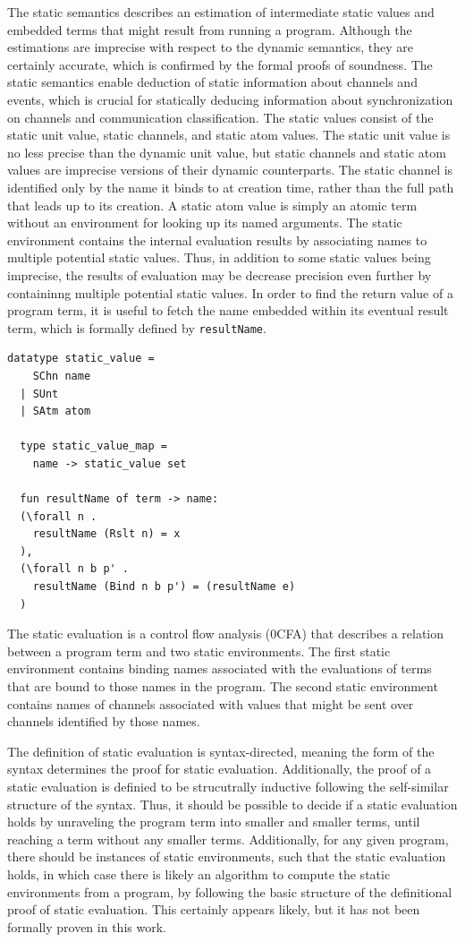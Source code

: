 \documentclass[10pt]{article}
\begin{document}
The static semantics describes an estimation of intermediate static values and embedded terms
that might result from running a program.  Although the estimations are imprecise with
respect to the dynamic semantics, they are certainly accurate,
which is confirmed by the formal proofs of soundness.
The static semantics enable deduction of static information about channels and events, which is
crucial for statically deducing information about synchronization on channels and
communication classification.
The static values consist of the static unit value, static channels, and static atom
values. The static unit value is no less precise than the dynamic unit value, but
static channels and static atom values are imprecise versions of their dynamic
counterparts. The static channel is identified only by the name it binds to at creation time,
rather than the full path that leads up to its creation.  A static atom value is simply an
atomic term without an environment for looking up its named arguments.  The static
environment contains the internal evaluation results by
associating names to multiple potential static values.
Thus, in addition to some static values being imprecise,
the results of evaluation may be decrease precision even further
by containinng multiple potential static values. 
In order to find the return value of a program term, it is useful to fetch the name
embedded within its eventual result term, which is formally defined by \lstinline{resultName}.

\begin{lstlisting}[language=logic, mathescape]
  datatype static_value =
    SChn name
  | SUnt
  | SAtm atom 

  type static_value_map =
    name -> static_value set

  fun resultName of term -> name:
  (\forall n .
    resultName (Rslt n) = x
  ),
  (\forall n b p' . 
    resultName (Bind n b p') = (resultName e)
  )
\end{lstlisting}

The static evaluation is a control flow analysis (0CFA)
that describes a relation between a program term and two static environments.
The first static environment contains binding names associated with the
evaluations of terms that are bound to those names in the program.
The second static environment contains names of channels associated
with values that might be sent over channels identified by those names.

The definition of static evaluation is syntax-directed, meaning the form of the syntax
determines the proof for static evaluation.  Additionally, the proof of a static evaluation
is definied to be strucutrally inductive following the self-similar structure of the syntax.
Thus, it should be possible to decide if a static evaluation holds
by unraveling the program term into smaller and smaller terms,
until reaching a term without any smaller terms.
Additionally, for any given program, there should be instances of static environments,
such that the static evaluation holds, in which case there is likely an
algorithm to compute the static environments from a program,
by following the basic structure of the definitional proof of static evaluation.
This certainly appears likely, but it has not been formally proven in this work.
\end{document}
